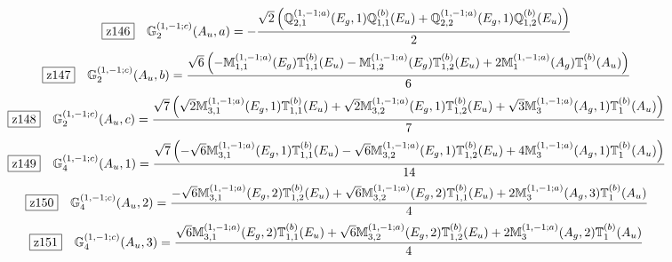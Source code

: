 \documentclass[fleqn,10pt,landscape]{jsarticle}
\begin{document}
\begin{dmath*}
\hspace*{3mm}\fbox{z146}\quad \mathbb{G}_{2}^{(1,-1;c)}(A_{u},a)=- \frac{\sqrt{2} \left(\mathbb{Q}_{2,1}^{(1,-1;a)}(E_{g},1) \mathbb{Q}_{1,1}^{(b)}(E_{u}) + \mathbb{Q}_{2,2}^{(1,-1;a)}(E_{g},1) \mathbb{Q}_{1,2}^{(b)}(E_{u})\right)}{2}
\end{dmath*}
\begin{dmath*}
\hspace*{3mm}\fbox{z147}\quad \mathbb{G}_{2}^{(1,-1;c)}(A_{u},b)=\frac{\sqrt{6} \left(- \mathbb{M}_{1,1}^{(1,-1;a)}(E_{g}) \mathbb{T}_{1,1}^{(b)}(E_{u}) - \mathbb{M}_{1,2}^{(1,-1;a)}(E_{g}) \mathbb{T}_{1,2}^{(b)}(E_{u}) + 2 \mathbb{M}_{1}^{(1,-1;a)}(A_{g}) \mathbb{T}_{1}^{(b)}(A_{u})\right)}{6}
\end{dmath*}
\begin{dmath*}
\hspace*{3mm}\fbox{z148}\quad \mathbb{G}_{2}^{(1,-1;c)}(A_{u},c)=\frac{\sqrt{7} \left(\sqrt{2} \mathbb{M}_{3,1}^{(1,-1;a)}(E_{g},1) \mathbb{T}_{1,1}^{(b)}(E_{u}) + \sqrt{2} \mathbb{M}_{3,2}^{(1,-1;a)}(E_{g},1) \mathbb{T}_{1,2}^{(b)}(E_{u}) + \sqrt{3} \mathbb{M}_{3}^{(1,-1;a)}(A_{g},1) \mathbb{T}_{1}^{(b)}(A_{u})\right)}{7}
\end{dmath*}
\begin{dmath*}
\hspace*{3mm}\fbox{z149}\quad \mathbb{G}_{4}^{(1,-1;c)}(A_{u},1)=\frac{\sqrt{7} \left(- \sqrt{6} \mathbb{M}_{3,1}^{(1,-1;a)}(E_{g},1) \mathbb{T}_{1,1}^{(b)}(E_{u}) - \sqrt{6} \mathbb{M}_{3,2}^{(1,-1;a)}(E_{g},1) \mathbb{T}_{1,2}^{(b)}(E_{u}) + 4 \mathbb{M}_{3}^{(1,-1;a)}(A_{g},1) \mathbb{T}_{1}^{(b)}(A_{u})\right)}{14}
\end{dmath*}
\begin{dmath*}
\hspace*{3mm}\fbox{z150}\quad \mathbb{G}_{4}^{(1,-1;c)}(A_{u},2)=\frac{- \sqrt{6} \mathbb{M}_{3,1}^{(1,-1;a)}(E_{g},2) \mathbb{T}_{1,2}^{(b)}(E_{u}) + \sqrt{6} \mathbb{M}_{3,2}^{(1,-1;a)}(E_{g},2) \mathbb{T}_{1,1}^{(b)}(E_{u}) + 2 \mathbb{M}_{3}^{(1,-1;a)}(A_{g},3) \mathbb{T}_{1}^{(b)}(A_{u})}{4}
\end{dmath*}
\begin{dmath*}
\hspace*{3mm}\fbox{z151}\quad \mathbb{G}_{4}^{(1,-1;c)}(A_{u},3)=\frac{\sqrt{6} \mathbb{M}_{3,1}^{(1,-1;a)}(E_{g},2) \mathbb{T}_{1,1}^{(b)}(E_{u}) + \sqrt{6} \mathbb{M}_{3,2}^{(1,-1;a)}(E_{g},2) \mathbb{T}_{1,2}^{(b)}(E_{u}) + 2 \mathbb{M}_{3}^{(1,-1;a)}(A_{g},2) \mathbb{T}_{1}^{(b)}(A_{u})}{4}
\end{dmath*}
\end{document}
